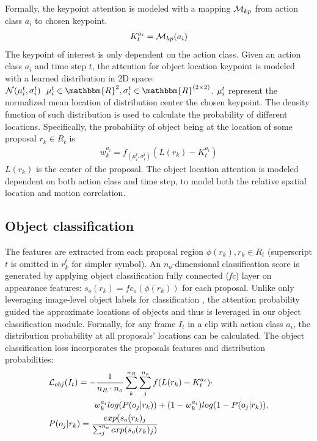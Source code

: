 Formally, the keypoint attention is modeled with a mapping ${\mathcal M}_{kp}$ from action class $a_i$ to chosen keypoint. 
\begin{align}
K_t^{a_i} = {\mathcal M}_{kp}(a_i)
\end{align}
The keypoint of interest is only dependent on the action class.
Given an action class $a_i$ and time step $t$, the attention for object location \wrt keypoint is modeled with a learned distribution in 2D space: $\scr{N}(\ve{\mu}_i^t, \ve{\sigma}_i^t)~~\ve{\mu}_i^t\in \mathbbm{R}^2, \ve{\sigma}_i^t\in \mathbbm{R}^{(2\times2)}$. ${\mathbf \mu}_i^t$ represent the normalized mean location of distribution center \wrt the chosen keypoint. The density function of such distribution is used to calculate the probability of different locations. Specifically, the probability of object being at the location of some proposal $r_k\in R_t$ is 
\begin{align}
w_k^{a_i}=f_{(\mu_i^t, \sigma_i^t)}(L(r_k)-K_t^{a_i})
\end{align}
$L(r_k)$ is the center of the proposal. The object location attention is modeled dependent on both action class and time step, to model both the relative spatial location and motion correlation. 

\subsection{Object classification}
The features are extracted from each proposal region $\phi(r_k), r_k \in R_t$ (superscript $t$ is omitted in $r_k^t$ for simpler symbol). An $n_o$-dimensional classification score is generated by applying object classification fully connected (\textit{fc}) layer on appearance features: $s_o(r_k) = fc_o(\phi(r_k))$ for each proposal. Unlike only leveraging image-level object labels for classification \cite{bilen2016weakly,kantorov2016contextlocnet}, the attention probability guided the approximate locations of objects and thus is leveraged in our object classification module. Formally, for any frame $I_t$ in a clip with action class $a_i$, the distribution probability at all proposals' locations can be calculated. The object classification loss incorporates the proposals features and distribution probabilities:
\begin{align}
\label{eqn:obj_cls_loss}
&{\mathcal L}_{obj} (I_t) = -\frac{1}{n_R\cdot n_o}\sum_{k}^{n_R}\sum_{j}^{n_o} f(L(r_k)-K_t^{a_i}) \cdot \nonumber \\
&~~~~~~~~~~~~~~~~w_k^{a_i}log(P(o_j|r_k))+(1-w_k^{a_i})log(1-P(o_j|r_k)), \nonumber\\
&P(o_j|r_k) = \frac{exp(s_o(r_k)_j}{\sum_{j}^{n_o}exp(s_o(r_k)_j)}
\end{align}

